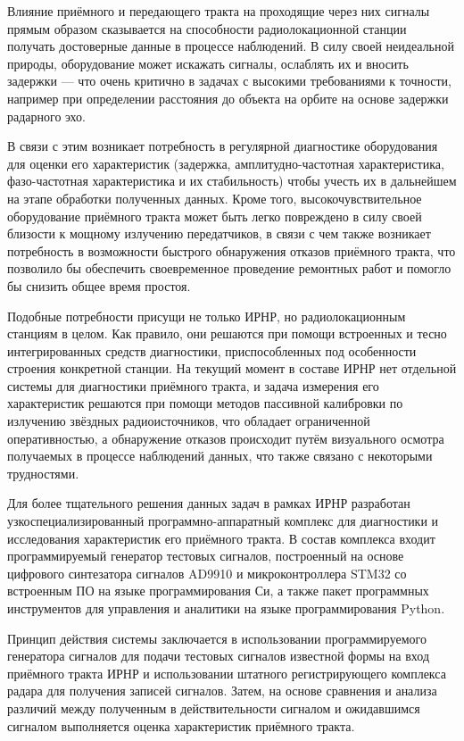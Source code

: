 \documentclass{report}
\begin{document}
Влияние приёмного и передающего тракта на проходящие через них сигналы прямым образом сказывается на способности радиолокационной станции получать достоверные данные в процессе наблюдений. В силу своей неидеальной природы, оборудование может искажать сигналы, ослаблять их и вносить задержки --- что очень критично в задачах с высокими требованиями к точности, например при определении расстояния до объекта на орбите на основе задержки радарного эхо.

В связи с этим возникает потребность в регулярной диагностике оборудования для оценки его характеристик (задержка, амплитудно-частотная характеристика, фазо-частотная характеристика и их стабильность) чтобы учесть их в дальнейшем на этапе обработки полученных данных. Кроме того, высокочувствительное оборудование приёмного тракта может быть легко повреждено в силу своей близости к мощному излучению передатчиков, в связи с чем также возникает потребность в возможности быстрого обнаружения отказов приёмного тракта, что позволило бы обеспечить своевременное проведение ремонтных работ и помогло бы снизить общее время простоя.

Подобные потребности присущи не только ИРНР, но радиолокационным станциям в целом. Как правило, они решаются при помощи встроенных и тесно интегрированных средств диагностики, приспособленных под особенности строения конкретной станции. На текущий момент в составе ИРНР нет отдельной системы для диагностики приёмного тракта, и задача измерения его характеристик решаются при помощи методов пассивной калибровки по излучению звёздных радиоисточников, что обладает ограниченной оперативностью, а обнаружение отказов происходит путём визуального осмотра получаемых в процессе наблюдений данных, что также связано с некоторыми трудностями.

Для более тщательного решения данных задач в рамках ИРНР разработан узкоспециализированный программно-аппаратный комплекс для диагностики и исследования характеристик его приёмного тракта. В состав комплекса входит программируемый генератор тестовых сигналов, построенный на основе цифрового синтезатора сигналов AD9910 и микроконтроллера STM32 со встроенным ПО на языке программирования Си, а также пакет программных инструментов для управления и аналитики на языке программирования Python.

Принцип действия системы заключается в использовании программируемого генератора сигналов для подачи тестовых сигналов известной формы на вход приёмного тракта ИРНР и использовании штатного регистрирующего комплекса радара для получения записей сигналов. Затем, на основе сравнения и анализа различий между полученным в действительности сигналом и ожидавшимся сигналом выполняется оценка характеристик приёмного тракта.
\end{document}
